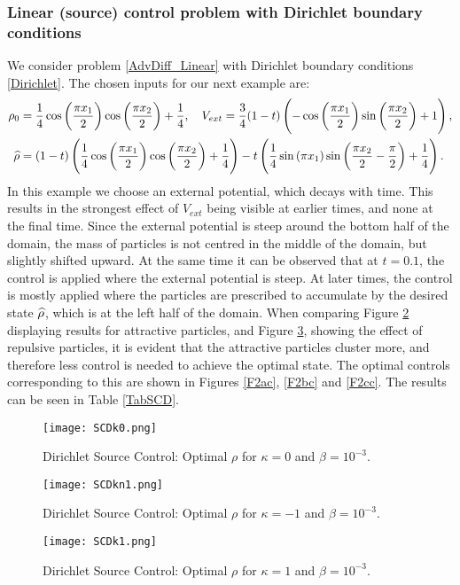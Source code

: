 \subsubsection{Linear (source) control problem with Dirichlet boundary conditions}
We consider problem \eqref{AdvDiff_Linear} with Dirichlet boundary conditions \eqref{Dirichlet}.
The chosen inputs for our next example are:
\begin{align*}
	\rho_0 &= \frac{1}{4}\cos\left(\frac{\pi x_1}{2}\right)\cos\left(\frac{\pi x_2}{2}\right) + \frac{1}{4}, \quad V_{ext} =  \frac{3}{4}(1-t)\left(-\cos\left(\frac{\pi x_1}{2}\right)\sin\left(\frac{\pi x_2}{2}\right) + 1\right),\\
	\widehat \rho &= (1 - t)\left(\frac{1}{4}\cos\left(\frac{\pi x_1}{2}\right)\cos\left(\frac{\pi x_2}{2}\right) + \frac{1}{4}\right) - t\left(\frac{1}{4}\sin\left(\pi x_1\right)\sin\left(\frac{\pi x_2}{2} - \frac{\pi}{2}\right) + \frac{1}{4}\right).
\end{align*}
In this example we choose an external potential, which decays with time. This results in the strongest effect of $V_{ext}$ being visible at earlier times, and none at the final time. Since the external potential is steep around the bottom half of the domain, the mass of particles is not centred in the middle of the domain, but slightly shifted upward. At the same time it can be observed that at $t= 0.1$, the control is applied where the external potential is steep. At later times, the control is mostly applied where the particles are prescribed to accumulate by the desired state $\widehat \rho$, which is at the left half of the domain.
When comparing Figure \ref{F2b} displaying results for attractive particles, and Figure \ref{F2c}, showing the effect of repulsive particles, it is evident that the attractive particles cluster more, and therefore less control is needed to achieve the optimal state. The optimal controls corresponding to this are shown in Figures \ref{F2ac}, \ref{F2bc} and \ref{F2cc}.
The results can be seen in Table \ref{TabSCD}.


\begin{figure}[h]
	\centering
	\texttt{[image: SCDk0.png]}
	\caption{Dirichlet Source Control: Optimal $\rho$ for $\kappa = 0$ and $\beta = 10^{-3}$.} 
	\label{F2a}
\end{figure}
\begin{figure}[h]
	\centering
	\texttt{[image: SCDkn1.png]}
	\caption{Dirichlet Source Control: Optimal $\rho$ for $\kappa = -1$ and $\beta = 10^{-3}$.} 
	\label{F2b}
\end{figure}
\begin{figure}[h]
	\centering
	\texttt{[image: SCDk1.png]}
	\caption{Dirichlet Source Control: Optimal $\rho$ for $\kappa = 1$ and $\beta = 10^{-3}$.} 
	\label{F2c}
\end{figure}

